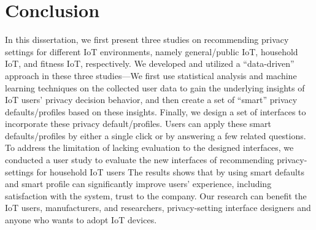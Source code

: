 \chapter{Conclusion}\label{chapter:conclusion}

In this dissertation, we first present three studies on recommending privacy settings for different IoT environments, namely general/public IoT, household IoT, and fitness IoT, respectively. We developed and utilized a ``data-driven” approach in these three studies—We first use statistical analysis and machine learning techniques on the collected user data to gain the underlying insights of IoT users' privacy decision behavior, and then create a set of ``smart” privacy defaults/profiles based on these insights. Finally, we design a set of interfaces to incorporate these privacy default/profiles. Users can apply these smart defaults/profiles by either a single click or by answering a few related questions. To address the limitation of lacking evaluation to the designed interfaces, we conducted a user study to evaluate the new interfaces of recommending privacy-settings for household IoT users The results shows that by using smart defaults and smart profile can significantly improve users' experience, including satisfaction with the system, trust to the company. Our research can benefit the IoT users, manufacturers, and researchers, privacy-setting interface designers and anyone who wants to adopt IoT devices.

